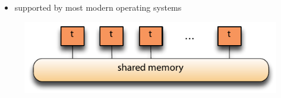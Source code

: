 \begin{frame}[fragile]
\begin{itemize}
\begin{itemize}
    \item supported by most modern operating systems
    \end{itemize}
%
  \end{itemize}
%
    \begin{figure}
      \centering
      \includegraphics[scale=0.5]{figures/threads-memory.pdf}
    \end{figure}
%
\end{frame}


